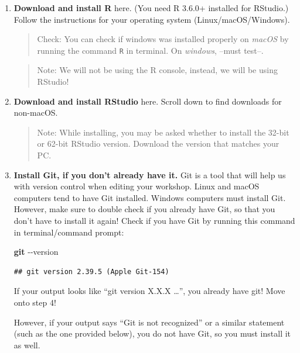\documentclass[
]{book}
\newenvironment{Shaded}{\begin{snugshade}}{\end{snugshade}}
\newcommand{\AttributeTok}[1]{\textcolor[rgb]{0.13,0.29,0.53}{#1}}
\newcommand{\FunctionTok}[1]{\textcolor[rgb]{0.13,0.29,0.53}{\textbf{#1}}}
\theoremstyle{definition}
\theoremstyle{definition}
\theoremstyle{definition}
\theoremstyle{definition}
\theoremstyle{remark}
\begin{document}
\begin{enumerate}
\def\labelenumi{\arabic{enumi}.}
\item
  \textbf{Download and install R} here. (You need R 3.6.0+ installed for RStudio.) Follow the instructions for your operating system (Linux/macOS/Windows).

  \begin{quote}
  Check: You can check if windows was installed properly on \emph{macOS} by running the command \texttt{R} in terminal. On \emph{windows}, --must test--.
  \end{quote}

  \begin{quote}
  Note: We will not be using the R console, instead, we will be using RStudio!
  \end{quote}
\item
  \textbf{Download and install RStudio} here. Scroll down to find downloads for non-macOS.

  \begin{quote}
  Note: While installing, you may be asked whether to install the 32-bit or 62-bit RStudio version. Download the version that matches your PC.
  \end{quote}
\item
  \textbf{Install Git, if you don't already have it.} Git is a tool that will help us with version control when editing your workshop. Linux and macOS computers tend to have Git installed. Windows computers must install Git. However, make sure to double check if you already have Git, so that you don't have to install it again! Check if you have Git by running this command in terminal/command prompt:

\begin{Shaded}
\begin{Highlighting}[]
\FunctionTok{git} \AttributeTok{{-}{-}version}
\end{Highlighting}
\end{Shaded}

\begin{verbatim}
## git version 2.39.5 (Apple Git-154)
\end{verbatim}

  If your output looks like ``git version X.X.X \ldots{}'', you already have git! Move onto step 4!

  However, if your output says ``Git is not recognized'' or a similar statement (such as the one provided below), you do not have Git, so you must install it as well.


\end{enumerate}
\end{document}
